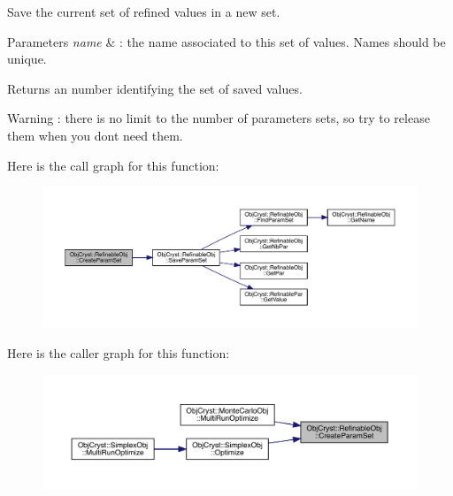Save the current set of refined values in a new set. 


\begin{DoxyParams}{Parameters}
{\em name} & \+: the name associated to this set of values. Names should be unique. \\
\hline
\end{DoxyParams}
\begin{DoxyReturn}{Returns}
an number identifying the set of saved values.
\end{DoxyReturn}
\begin{DoxyWarning}{Warning}
\+: there is no limit to the number of parameters sets, so try to release them when you don\textquotesingle{}t need them. 
\end{DoxyWarning}
Here is the call graph for this function\+:
\nopagebreak
\begin{figure}[H]
\begin{center}
\leavevmode
\includegraphics[width=350pt]{class_obj_cryst_1_1_refinable_obj_abb7ba59ef7cad325753587b484e60bfe_cgraph}
\end{center}
\end{figure}
Here is the caller graph for this function\+:
\nopagebreak
\begin{figure}[H]
\begin{center}
\leavevmode
\includegraphics[width=350pt]{class_obj_cryst_1_1_refinable_obj_abb7ba59ef7cad325753587b484e60bfe_icgraph}
\end{center}
\end{figure}
\mbox{\label{class_obj_cryst_1_1_refinable_obj_a05342aa16f7b0c0a2cf3380de16f75ef}} 
